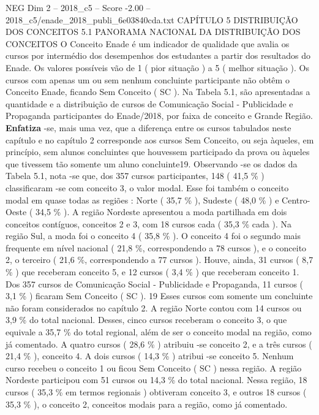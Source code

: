 \begin{textsample}{NEG Dim 2 – 2018\_c5 – Score -2.00 – 2018\_c5/enade\_2018\_publi\_6e03840cda.txt}  \label{ex:f2_neg_119}
CAPÍTULO 5 DISTRIBUIÇÃO DOS CONCEITOS 5.1 PANORAMA NACIONAL DA DISTRIBUIÇÃO DOS CONCEITOS O Conceito Enade é um indicador de qualidade que avalia os cursos por intermédio dos desempenhos dos estudantes a partir dos resultados do Enade.
Os valores possíveis vão de 1 ( pior situação ) a 5 ( melhor situação ).
Os cursos com apenas um ou sem nenhum concluinte participante não obtêm o Conceito Enade, ficando Sem Conceito ( SC ).
Na Tabela 5.1, são apresentadas a quantidade e a distribuição de cursos de Comunicação Social - Publicidade e Propaganda participantes do Enade/2018, por faixa de conceito e Grande Região. \textbf{Enfatiza} -se, mais uma vez, que a diferença entre os cursos tabulados neste capítulo e no capítulo 2 corresponde aos cursos Sem Conceito, ou seja àqueles, em princípio, sem alunos concluintes que houvessem participado da prova ou àqueles que tivessem tão somente um aluno concluinte19.
Observando -se os dados da Tabela 5.1, nota -se que, dos 357 cursos participantes, 148 ( 41,5 \% ) classificaram -se com conceito 3, o valor modal.
Esse foi também o conceito modal em quase todas as regiões : Norte ( 35,7 \% ), Sudeste ( 48,0 \% ) e Centro-Oeste ( 34,5 \% ).
A região Nordeste apresentou a moda partilhada em dois conceitos contíguos, conceitos 2 e 3, com 18 cursos cada ( 35,3 \% cada ).
Na região Sul, a moda foi o conceito 4 ( 35,8 \% ).
O conceito 4 foi o segundo mais frequente em nível nacional ( 21,8 \%, correspondendo a 78 cursos ), e o conceito 2, o terceiro ( 21,6 \%, correspondendo a 77 cursos ).
Houve, ainda, 31 cursos ( 8,7 \% ) que receberam conceito 5, e 12 cursos ( 3,4 \% ) que receberam conceito 1.
Dos 357 cursos de Comunicação Social - Publicidade e Propaganda, 11 cursos ( 3,1 \% ) ficaram Sem Conceito ( SC ). 19 Esses cursos com somente um concluinte não foram considerados no capítulo 2.
A região Norte contou com 14 cursos ou 3,9 \% do total nacional.
Desses, cinco cursos receberam o conceito 3, o que equivale a 35,7 \% do total regional, além de ser o conceito modal na região, como já comentado.
A quatro cursos ( 28,6 \% ) atribuiu -se conceito 2, e a três cursos ( 21,4 \% ), conceito 4.
A dois cursos ( 14,3 \% ) atribui -se conceito 5.
Nenhum curso recebeu o conceito 1 ou ficou Sem Conceito ( SC ) nessa região.
A região Nordeste participou com 51 cursos ou 14,3 \% do total nacional.
Nessa região, 18 cursos ( 35,3 \% em termos regionais ) obtiveram conceito 3, e outros 18 cursos ( 35,3 \% ), o conceito 2, conceitos modais para a região, como já comentado.

\end{textsample}
